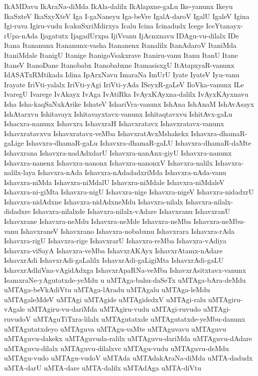 {IkAMDavu
IkAraNa-diMda
IkAla-dalilx
IkAlapxne-gaLu
Ike-yanunx
Ikeyu
IkaSxteV
IkaSxyXteV
Iga
I-gaNaneyu
Iga-beVre
IgalA-daroV
IgalU
IgaleV
Igina
Igi-ruva
Igiru-vudu
IcakuSxriMdirxya
Icalu
Icina
Icinadudx
Icege
IceYtanayx-rUpa-nAda
Ijagatutx
IjagadUrxpa
IjiVvanu
IjAcnxnavu
IDAgu-vu-dilalx
IDe
Itana
Itananunx
Itananunx-vasha
Itananenx
Itanalilx
ItanAdaroV
ItaniMda
ItaniMdale
ItanigU
Itanige
ItanigoVsakxrave
Itaniru-vanu
Itanu
ItanU
Itane
ItaneV
ItanoDane
Itanobabx
Itanobabxne
ItamasisxgU
ItAtapxyaR-vanunx
IdASATxRMtikada
Idina
IpArxNavu
ImaraNa
ImUrU
Iyate
IyateV
Iyu-vanu
Irayate
IriVti-yalalx
IriVti-yAgi
IriVti-yAda
ISeyxR-gaLeV
IloVka-vanunx
ILe
IvaregU
Ivarege
IvAkayx
IvAga
IvAtiRka
IvAyxKAyxna-dalilx
IvAyxKAyxnavu
Isha
Isha-kaqSaNxkArike
IshateV
IshariVra-vanunx
IshAna
IshAnaM
IshAvAsayx
IshAtarxvu
Ishitavayx
Ishitavayxtavx-vanunx
Ishitaqtavxvu
IshitAvx-gaLu
Ishacxra-nanunx
Ishavxra
IshavxraH
Ishavxratavx
Ishavxratavx-vanunx
Ishavxratavxvu
Ishavxratavx-veMba
IshavxratAvxMshakekx
Ishavxra-dhamaR-gaLige
Ishavxra-dhamaR-gaLu
Ishavxra-dhamaR-gaLU
Ishavxra-dhamaR-daMte
Ishavxrana
Ishavxra-nadAdxdarU
Ishavxra-nanAnx-giyU
Ishavxra-nanunx
Ishavxra-nanenx
Ishavxra-nanonx
Ishavxra-nanonxV
Ishavxra-nalilx
Ishavxra-nalilx-laya
Ishavxra-nAda
Ishavxra-nAdadadxriMda
Ishavxra-nAda-vanu
Ishavxra-niMda
Ishavxra-niMdalU
Ishavxra-niMdale
Ishavxra-niMdaleV
Ishavxra-ni-giMta
Ishavxra-nigU
Ishavxra-nige
Ishavxra-nigeV
Ishavxra-nidadxrU
Ishavxra-nidAdxne
Ishavxra-nidAdxneMdu
Ishavxra-nilalx
Ishavxra-nilalx-didadxre
Ishavxra-nilalxde
Ishavxra-nilalx-vAdare
Ishavxranu
IshavxranU
Ishavxrane
Ishavxra-neMdu
Ishavxra-neMde
Ishavxra-neMba
Ishavxra-neMbu-vanu
IshavxraneV
Ishavxrano
Ishavxra-nobabxnu
Ishavxrara
Ishavxra-rAda
Ishavxra-rigU
Ishavxra-rige
IshavxrarU
Ishavxra-reMba
Ishavxra-vAdiya
Ishavxra-viSayA
Ishavxra-veMba
IshavxrAKAyx
IshavxrAtamx-nAdare
IshavxrAdi
IshavxrAdi-gaLalilx
IshavxrAdi-gaLigiMta
IshavxrAdi-gaLU
IshavxrAdhiVna-vAgidAdxga
IshavxrApaRNa-veMba
IshavxrAsitxtavx-vanunx
IsamxraNe-yAgutatxde-yeMdu
u
uMTAga-bahu-daSeTx
uMTAga-bAra-deMdu
uMTAga-beVkAdiVtu
uMTAga-lAradu
uMTAgalu
uMTAga-leMdu
uMTAgaleMdeV
uMTAgi
uMTAgide
uMTAgidedxV
uMTAgi-ralu
uMTAgiru-vAgale
uMTAgiru-vu-dariMda
uMTAgiru-vudu
uMTAgi-ruvudo
uMTAgi-ruvudoV
uMTAguTiTxra-lilalx
uMTAgutatxde
uMTAgutatxde-yeMbu-danunx
uMTAgutatxdeyo
uMTAguva
uMTAgu-vaMte
uMTAguvavu
uMTAguvu
uMTAguvu-dakekx
uMTAguvuda-ralilx
uMTAguvu-dariMda
uMTAguvu-dAdare
uMTAguvu-dilalx
uMTAguvu-dilalxve
uMTAgu-vudu
uMTAguvu-deMdu
uMTAgu-vudo
uMTAgu-vudoV
uMTAda
uMTAdakAraNa-diMda
uMTA-dadudx
uMTA-darU
uMTA-dare
uMTA-dalilx
uMTAdAga
uMTA-diVtu
}

